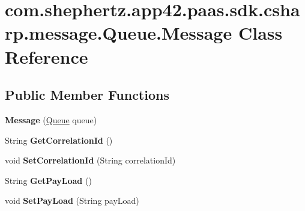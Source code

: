 \hypertarget{classcom_1_1shephertz_1_1app42_1_1paas_1_1sdk_1_1csharp_1_1message_1_1_queue_1_1_message}{\section{com.\+shephertz.\+app42.\+paas.\+sdk.\+csharp.\+message.\+Queue.\+Message Class Reference}
\label{classcom_1_1shephertz_1_1app42_1_1paas_1_1sdk_1_1csharp_1_1message_1_1_queue_1_1_message}
}
\subsection*{Public Member Functions}
\begin{DoxyCompactItemize}
\item 
\hypertarget{classcom_1_1shephertz_1_1app42_1_1paas_1_1sdk_1_1csharp_1_1message_1_1_queue_1_1_message_a0075588a3b737e50a75e48b5ffbb6939}{{\bfseries Message} (\hyperlink{classcom_1_1shephertz_1_1app42_1_1paas_1_1sdk_1_1csharp_1_1message_1_1_queue}{Queue} queue)}\label{classcom_1_1shephertz_1_1app42_1_1paas_1_1sdk_1_1csharp_1_1message_1_1_queue_1_1_message_a0075588a3b737e50a75e48b5ffbb6939}

\item 
\hypertarget{classcom_1_1shephertz_1_1app42_1_1paas_1_1sdk_1_1csharp_1_1message_1_1_queue_1_1_message_a73112326e805cb8b8ffa61b4be9c8f14}{String {\bfseries Get\+Correlation\+Id} ()}\label{classcom_1_1shephertz_1_1app42_1_1paas_1_1sdk_1_1csharp_1_1message_1_1_queue_1_1_message_a73112326e805cb8b8ffa61b4be9c8f14}

\item 
\hypertarget{classcom_1_1shephertz_1_1app42_1_1paas_1_1sdk_1_1csharp_1_1message_1_1_queue_1_1_message_a2ac3afd8340d2568410552521c9b4308}{void {\bfseries Set\+Correlation\+Id} (String correlation\+Id)}\label{classcom_1_1shephertz_1_1app42_1_1paas_1_1sdk_1_1csharp_1_1message_1_1_queue_1_1_message_a2ac3afd8340d2568410552521c9b4308}

\item 
\hypertarget{classcom_1_1shephertz_1_1app42_1_1paas_1_1sdk_1_1csharp_1_1message_1_1_queue_1_1_message_a45b871f53c7ff2df2bfd779eb9dffc3d}{String {\bfseries Get\+Pay\+Load} ()}\label{classcom_1_1shephertz_1_1app42_1_1paas_1_1sdk_1_1csharp_1_1message_1_1_queue_1_1_message_a45b871f53c7ff2df2bfd779eb9dffc3d}

\item 
\hypertarget{classcom_1_1shephertz_1_1app42_1_1paas_1_1sdk_1_1csharp_1_1message_1_1_queue_1_1_message_a84511423732526712286cf053a1cf8a0}{void {\bfseries Set\+Pay\+Load} (String pay\+Load)}\label{classcom_1_1shephertz_1_1app42_1_1paas_1_1sdk_1_1csharp_1_1message_1_1_queue_1_1_message_a84511423732526712286cf053a1cf8a0}


\end{DoxyCompactItemize}
